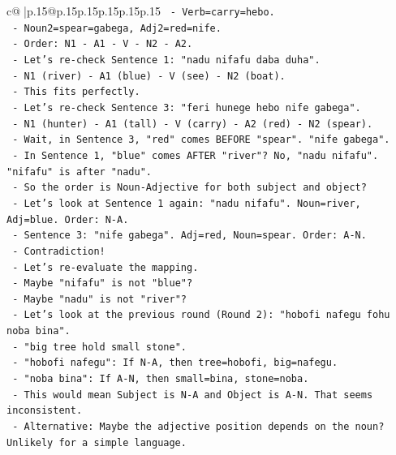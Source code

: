 \documentclass{article}
\begin{document}
{\begin{supertabular}{c@{$\;$}|p{.15\linewidth}@{}p{.15\linewidth}p{.15\linewidth}p{.15\linewidth}p{.15\linewidth}p{.15\linewidth}}
{{{\texttt{       {-} Verb=carry=hebo.} \\
\texttt{       {-} Noun2=spear=gabega, Adj2=red=nife.} \\
\texttt{     {-} Order: N1 {-} A1 {-} V {-} N2 {-} A2.} \\
\texttt{     {-} Let's re{-}check Sentence 1: "nadu nifafu daba duha".} \\
\texttt{       {-} N1 (river) {-} A1 (blue) {-} V (see) {-} N2 (boat).} \\
\texttt{       {-} This fits perfectly.} \\
\texttt{   {-} Let's re{-}check Sentence 3: "feri hunege hebo nife gabega".} \\
\texttt{       {-} N1 (hunter) {-} A1 (tall) {-} V (carry) {-} A2 (red) {-} N2 (spear).} \\
\texttt{       {-} Wait, in Sentence 3, "red" comes BEFORE "spear". "nife gabega".} \\
\texttt{       {-} In Sentence 1, "blue" comes AFTER "river"? No, "nadu nifafu". "nifafu" is after "nadu".} \\
\texttt{       {-} So the order is Noun{-}Adjective for both subject and object?} \\
\texttt{       {-} Let's look at Sentence 1 again: "nadu nifafu". Noun=river, Adj=blue. Order: N{-}A.} \\
\texttt{       {-} Sentence 3: "nife gabega". Adj=red, Noun=spear. Order: A{-}N.} \\
\texttt{       {-} Contradiction!} \\
\texttt{       {-} Let's re{-}evaluate the mapping.} \\
\texttt{       {-} Maybe "nifafu" is not "blue"?} \\
\texttt{       {-} Maybe "nadu" is not "river"?} \\
\texttt{       {-} Let's look at the previous round (Round 2): "hobofi nafegu fohu noba bina".} \\
\texttt{         {-} "big tree hold small stone".} \\
\texttt{         {-} "hobofi nafegu": If N{-}A, then tree=hobofi, big=nafegu.} \\
\texttt{         {-} "noba bina": If A{-}N, then small=bina, stone=noba.} \\
\texttt{         {-} This would mean Subject is N{-}A and Object is A{-}N. That seems inconsistent.} \\
\texttt{       {-} Alternative: Maybe the adjective position depends on the noun? Unlikely for a simple language.} \\
}}}
\end{supertabular}}
\end{document}
